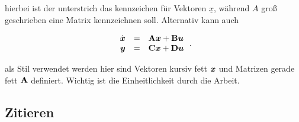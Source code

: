 hierbei ist der unterstrich das kennzeichen für Vektoren $\underline{x}$, während $A$ groß geschrieben eine Matrix kennzeichnen soll. Alternativ kann auch 

\begin{equation}
\begin{array}{rcl}
\dot{\boldsymbol{x}} & = & \boldsymbol{\mathrm{A}}\boldsymbol{x} + \boldsymbol{\mathrm{B}}\boldsymbol{u}\\
\boldsymbol{y} & = & \boldsymbol{\mathrm{C}}\boldsymbol{x} + \boldsymbol{\mathrm{D}}\boldsymbol{u}
\end{array}\,.
\label{eq:linear}
\end{equation}

als Stil verwendet werden hier sind Vektoren kursiv fett $\boldsymbol{x}$ und Matrizen gerade fett $\boldsymbol{\mathrm{A}}$ definiert. Wichtig ist die Einheitlichkeit durch die Arbeit.

\subsection{Zitieren}
\label{sec:zitieren}

